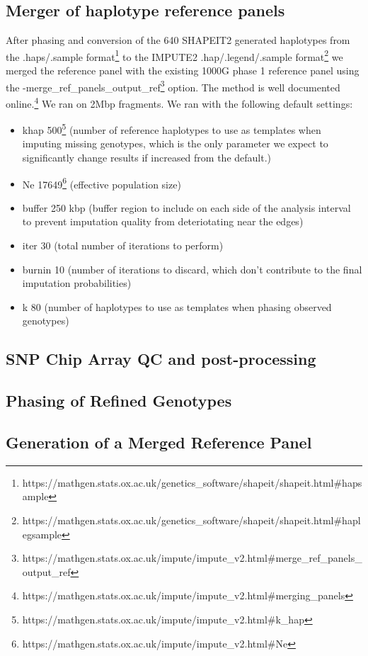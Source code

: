 \subsection{Merger of haplotype reference panels}
After phasing and conversion of the 640 SHAPEIT2 generated haplotypes from the .haps/.sample format\footnote{https://mathgen.stats.ox.ac.uk/genetics\_software/shapeit/shapeit.html\#hapsample} to the IMPUTE2 .hap/.legend/.sample format\footnote{https://mathgen.stats.ox.ac.uk/genetics\_software/shapeit/shapeit.html\#haplegsample} we merged the reference panel with the existing \gls{1000G} phase 1 reference panel using the -{}\-merge\_ref\_panels\_output\_ref\footnote{https://mathgen.stats.ox.ac.uk/impute/impute\_v2.html\#\-merge\_ref\_panels\_output\_ref} option.
The method is well documented online.\footnote{https://mathgen.stats.ox.ac.uk/impute/impute\_v2.html\#merging\_panels}
We ran on 2\gls{Mbp} fragments. We ran with the following default settings:
\begin{itemize}
\item \-khap 500\footnote{https://mathgen.stats.ox.ac.uk/impute/impute\_v2.html\#\-k\_hap} (number of reference haplotypes to use as templates when imputing missing genotypes, which is the only parameter we expect to significantly change results if increased from the default.)
\item \-Ne 17649\footnote{https://mathgen.stats.ox.ac.uk/impute/impute\_v2.html\#\-Ne} (effective population size\cite{Wright01031931}\cite{Wright1938})
\item \-buffer 250 \gls{kbp} (buffer region to include on each side of the analysis interval to prevent imputation quality from deteriotating near the edges)
\item \-iter 30 (total number of iterations to perform)
\item \-burnin 10 (number of iterations to discard, which don't contribute to the final imputation probabilities)
\item \-k 80 (number of haplotypes to use as templates when phasing observed genotypes)
\end{itemize}



\subsection{SNP Chip Array QC and post-processing}
\subsection{Phasing of Refined Genotypes}
\subsection{Generation of a Merged Reference Panel}